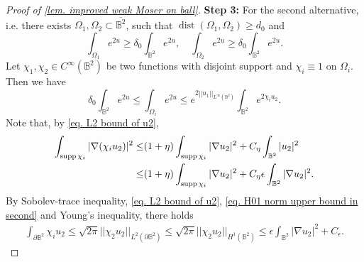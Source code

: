 \documentclass[11pt,a4paper,twoside]{amsart}
\newtheorem{sketch proof}{Sketch of the proof}[section]
\begin{document}
\begin{proof}[Proof of \cref{lem. improved weak Moser on ball}]
        {\bf Step 3:} For the second alternative, i.e. there exists $\Omega_1,\Omega_2\subset \overline{\mathbb{B}^2}$, such that $\operatorname{dist}(\Omega_1,\Omega_2)\geq d_0$ and
        \[
        \int_{\Omega_1}e^{2u}
        \geq \delta_0
        \int_{\mathbb{B}^2}e^{2u},\quad
        \int_{\Omega_2}e^{2u}
        \geq \delta_0
        \int_{\mathbb{B}^2}e^{2u}.
        \]
        Let $\chi_1,\chi_2\in C^\infty(\mathbb{B}^2)$ be two functions with disjoint support and $\chi_i\equiv 1$ on $\Omega_i$. Then we have
        \begin{equation}\label{eq. area upper bound in second alternative}
            \delta_0 \int_{\mathbb{B}^2}e^{2u}
        \leq \int_{\Omega_i}e^{2u}
        \leq e^{2||u_1||
        _{L^\infty(\mathbb{B}^2)}}
        \int_{\mathbb{B}^2}
        e^{2\chi_i u_2}.
        \end{equation}
        Note that, by \cref{eq. L2 bound of u2},
        \begin{align}
            \int_{\operatorname{supp}\chi_i}
            |\nabla(\chi_i u_2)|^2
        \leq& (1+\eta)
        \int_{\operatorname{supp}\chi_i}
        |\nabla u_2|^2
        +C_\eta\int_{\mathbb{B}^2}|u_2|^2\notag
        \\
        \leq& (1+\eta)
        \int_{\operatorname{supp}\chi_i}|\nabla u_2|^2
        +C_\eta\epsilon
        \int_{\mathbb{B}^2}|\nabla u_2|^2.
        \label{eq. H01 norm upper bound in second}
        \end{align}
        By Sobolev-trace inequality, \cref{eq. L2 bound of u2}, \cref{eq. H01 norm upper bound in second} and Young's inequality, there holds
        \begin{align}
        \label{eq. upper bound of trace}
            \int_{\partial\mathbb{B}^2}\chi_i u_2
            \leq \sqrt{2\pi}
            ||\chi_2u_2||
            _{L^2(\partial \mathbb{B}^2)}
            \leq \sqrt{2\pi}
            ||\chi_2u_2||
            _{H^{1}(\mathbb{B}^2)}
            \leq \epsilon \int_{\mathbb{B}^2}
            |\nabla u_2|^2+C_\epsilon.
        \end{align}
        


\end{proof}
\end{document}
